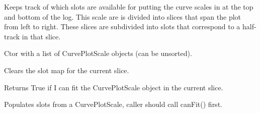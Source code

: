 \documentclass[letterpaper,10pt,english]{sphinxmanual}
\begin{document}
\begin{fulllineitems}
\label{\detokenize{ref/util/plot/Plot:TotalDepth.util.plot.Plot.CurvePlotScaleSlotMap}}
Keeps track of which slots are available for putting the curve scales in
at the top and bottom of the log.
This scale are is divided into slices that span the plot from left to right.
These slices are subdivided into slots that correspond to a half-track in
that slice.

\begin{fulllineitems}
\label{\detokenize{ref/util/plot/Plot:TotalDepth.util.plot.Plot.CurvePlotScaleSlotMap.__init__}}
Ctor with a list of CurvePlotScale objects (can be unsorted).

\end{fulllineitems}


\begin{fulllineitems}
\label{\detokenize{ref/util/plot/Plot:TotalDepth.util.plot.Plot.CurvePlotScaleSlotMap.reset}}
Clears the slot map for the current slice.

\end{fulllineitems}


\begin{fulllineitems}
\label{\detokenize{ref/util/plot/Plot:TotalDepth.util.plot.Plot.CurvePlotScaleSlotMap.canFit}}
Returns True if I can fit the CurvePlotScale object in the current slice.

\end{fulllineitems}


\begin{fulllineitems}
\label{\detokenize{ref/util/plot/Plot:TotalDepth.util.plot.Plot.CurvePlotScaleSlotMap.fit}}
Populates slots from a CurvePlotScale, caller should call canFit() first.


\end{fulllineitems}
\end{fulllineitems}
\end{document}
